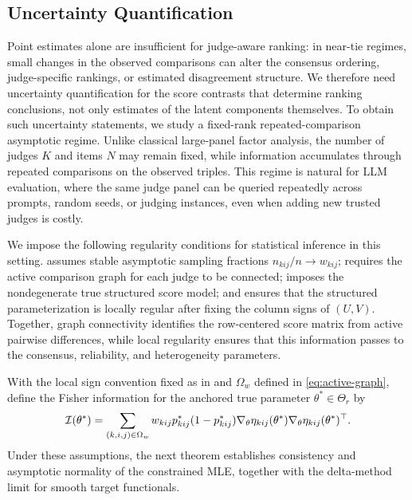 \documentclass{article}
\begin{document}
\begin{bibunit}[unsrtnat]
\subsection{Uncertainty Quantification} \label{subsec:UQ}

Point estimates alone are insufficient for judge-aware ranking: in near-tie regimes, small changes in the observed comparisons can alter the consensus ordering, judge-specific rankings, or estimated disagreement structure. 
We therefore need uncertainty quantification for the score contrasts that determine ranking conclusions, not only estimates of the latent components themselves.
To obtain such uncertainty statements, we study a fixed-rank repeated-comparison asymptotic regime. Unlike classical large-panel factor analysis, the number of judges \(K\) and items \(N\) may remain fixed, while information accumulates through repeated comparisons on the observed triples. 
This regime is natural for LLM evaluation, where the same judge panel can be queried repeatedly across prompts, random seeds, or judging instances, even when adding new trusted judges is costly.


We impose the following regularity conditions for statistical inference in this setting. 
 assumes stable asymptotic sampling fractions \(n_{kij}/n\to w_{kij}\);  requires the active comparison graph for each judge to be connected;  imposes the nondegenerate true structured score model; and  ensures that the structured parameterization is locally regular after fixing the column signs of \((U,V)\). 
Together, graph connectivity identifies the row-centered score matrix from active pairwise differences, while local regularity ensures that this information passes to the consensus, reliability, and heterogeneity parameters.

With the local sign convention fixed as in  and
\(\Omega_w\) defined in \eqref{eq:active-graph}, define the Fisher information
for the anchored true parameter \(\theta^*\in\Theta_r\) by
\begin{align}
    \mathcal{I}(\theta^*)
    =
    \sum_{(k,i,j)\in\Omega_w}
    w_{kij} p_{kij}^*(1-p_{kij}^*)
    \nabla_{\theta}\eta_{kij}(\theta^*)
    \nabla_{\theta}\eta_{kij}(\theta^*)^\top .\label{eq:fisher-aggregate}
\end{align}
Under these assumptions, the next theorem establishes consistency and asymptotic normality of the constrained MLE, together with the delta-method limit for smooth target functionals.


\end{bibunit}
\end{document}
